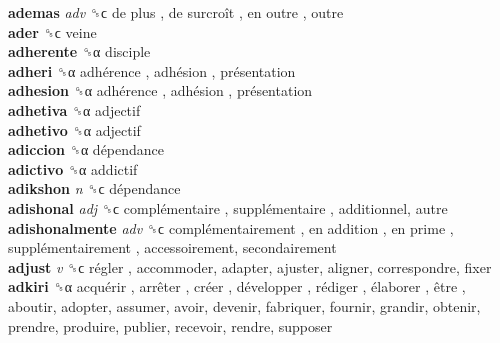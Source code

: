 \textbf{ademas} \emph{adv}  ␝ϲ   de plus ,  de surcroît ,  en outre , outre  \\
\textbf{ader} ␝ϲ  veine  \\
\textbf{adherente} ␝α  disciple  \\
\textbf{adheri} ␝α   adhérence ,  adhésion ,  présentation   \\
\textbf{adhesion} ␝α   adhérence ,  adhésion ,  présentation   \\
\textbf{adhetiva} ␝α  adjectif  \\
\textbf{adhetivo} ␝α  adjectif  \\
\textbf{adiccion} ␝α   dépendance   \\
\textbf{adictivo} ␝α  addictif  \\
\textbf{adikshon} \emph{n}  ␝ϲ   dépendance   \\
\textbf{adishonal} \emph{adj}  ␝ϲ   complémentaire ,  supplémentaire , additionnel, autre  \\
\textbf{adishonalmente} \emph{adv}  ␝ϲ   complémentairement ,  en addition ,  en prime ,  supplémentairement , accessoirement, secondairement  \\
\textbf{adjust} \emph{v}  ␝ϲ   régler , accommoder, adapter, ajuster, aligner, correspondre, fixer  \\
\textbf{adkiri} ␝α   acquérir ,  arrêter ,  créer ,  développer ,  rédiger ,  élaborer ,  être , aboutir, adopter, assumer, avoir, devenir, fabriquer, fournir, grandir, obtenir, prendre, produire, publier, recevoir, rendre, supposer  \\
